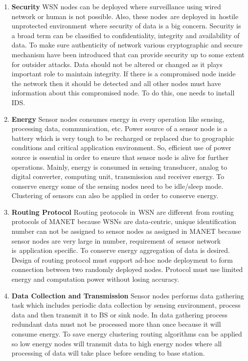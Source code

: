 \begin{enumerate}[label=\textbf{\roman*.}]
    \item \textbf{Security }
    WSN nodes can be deployed where surveillance using wired network or human is not possible. Also, these nodes\textcolor{white}{e}are deployed in\textcolor{white}{e}hostile unprotected environment\textcolor{white}{e}where security of data is a big concern. Security is a broad term can be classified to confidentiality, integrity and availability of data. To make sure authenticity of network various cryptographic and secure mechanism have been introduced that can provide security up to some extent for outsider attacks. Data should not be altered or changed as it plays important role to maintain integrity. If there is a compromised node inside the network then it should be detected and all other nodes must have information about this compromised node. To do this, one needs to install IDS.
    \item \textbf{Energy }
    Sensor nodes consumes energy in every operation like sensing, processing data, communication, etc. Power source of a sensor node is a battery which is very tough to be recharged or replaced due to geographic conditions and critical application environment. So, efficient use of power source is essential in order to ensure that sensor node is alive for further operations. Mainly, energy is consumed in sensing transducer, analog to digital converter, computing unit, transmission and receiver energy. To conserve energy some of the sensing nodes need to be idle/sleep mode. Clustering of sensors can also be applied in order to conserve energy.
    \item \textbf{Routing Protocol }
    Routing protocols in\textcolor{white}{e}WSN are different\textcolor{white}{e}from routing protocols of MANET because WSNs are data-centric, unique identification number can not be assigned to sensor nodes as assigned in MANET because sensor nodes are very large in number, requirement of\textcolor{white}{e}sensor network is\textcolor{white}{e}application specific. To conserve energy aggregation of data is desired. Design of routing protocol must support ad-hoc node deployment to form connection between two randomly deployed nodes. Protocol must use limited energy and computation power without losing accuracy.
    \item \textbf{Data Collection and Transmission }
    Sensor nodes performs data gathering task which includes periodic data collection by sensing environment, process data and then transmit it to BS or sink node. In data gathering process redundant data must not be processed more than once because it will consume energy. To save energy clustering routing algorithms can be applied so low energy nodes will transmit data to high energy nodes where all processing of data will take place before sending to base station.

\end{enumerate}
